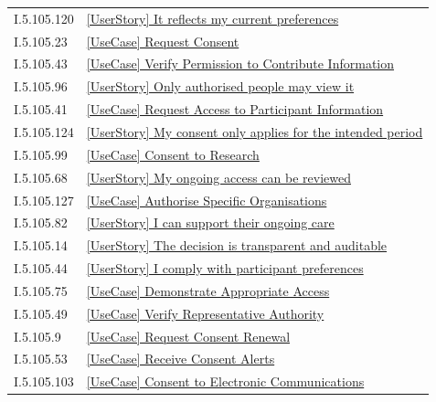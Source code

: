 \begin{longtable}{p{.22\linewidth}p{.73\linewidth}}
I.5.105.120 & \hyperref[element:38adc4de7d3b4b65a14f543fd0d25df3]{[UserStory] It reflects my current preferences} \\
I.5.105.23 & \hyperref[element:3a482d1b829a4c9686107ae3c1ba9a78]{[UseCase] Request Consent} \\
I.5.105.43 & \hyperref[element:3c165f8f9ab14c3495701173ce4ffd89]{[UseCase] Verify Permission to Contribute Information} \\
I.5.105.96 & \hyperref[element:3ef8328bf17d413a88546014431ce94b]{[UserStory] Only authorised people may view it} \\
I.5.105.41 & \hyperref[element:407592a108e64a609eb683cec67f47b2]{[UseCase] Request Access to Participant Information} \\
I.5.105.124 & \hyperref[element:40f04f92041c4286971386c746c2443a]{[UserStory] My consent only applies for the intended period} \\
I.5.105.99 & \hyperref[element:42331fe4084f45f8ad358e8f2721f389]{[UseCase] Consent to Research} \\
I.5.105.68 & \hyperref[element:4275909f87334d8485c60eed2b9e010c]{[UserStory] My ongoing access can be reviewed} \\
I.5.105.127 & \hyperref[element:42e9298d67424ef0954565c63e99a39d]{[UseCase] Authorise Specific Organisations} \\
I.5.105.82 & \hyperref[element:44a3ed4813b040b191c977547701d7c0]{[UserStory] I can support their ongoing care} \\
I.5.105.14 & \hyperref[element:4a8dd2ea977046bdb6a2bf046a593bf6]{[UserStory] The decision is transparent and auditable} \\
I.5.105.44 & \hyperref[element:4d008e13cb544371af198c2ac2412409]{[UserStory] I comply with participant preferences} \\
I.5.105.75 & \hyperref[element:4e2d087b91ed427ca552e962022c6d26]{[UseCase] Demonstrate Appropriate Access} \\
I.5.105.49 & \hyperref[element:4e59f2e2d8c04c728824fd652c20d102]{[UseCase] Verify Representative Authority} \\
I.5.105.9 & \hyperref[element:4e648bacd2484ba7bacafcfa12c87af2]{[UseCase] Request Consent Renewal} \\
I.5.105.53 & \hyperref[element:506f4e82609945aeb8bfab5769d10b1a]{[UseCase] Receive Consent Alerts} \\
I.5.105.103 & \hyperref[element:51ef40dda0084d678997fbd009a31779]{[UseCase] Consent to Electronic Communications} \\

\end{longtable}
